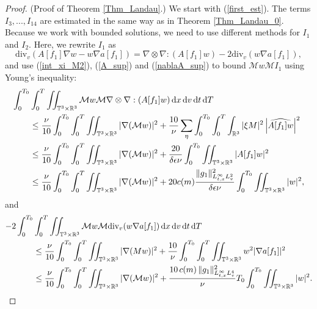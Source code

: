 \documentclass[11pt,american, reqno]{amsart}
\numberwithin{equation}{section}
\newcommand{\R}{\mathbb R}
\newcommand{\1}{\mathds{1}}
\newcommand{\dt}{\, {\rm d} t}
\newcommand{\dT}{\, {\rm d} T}
\newcommand{\dv}{\, {\rm d} v}
\newcommand{\dx}{\, {\rm d} x}
\newcommand{\CalM}{\mathcal{M}}
\newcommand{\dxi}{\, {\rm d} \xi}
\newcommand{\Eps}{\epsilon}
\newcommand{\abs}[1]{\left\vert#1\right\vert}
\newcommand{\T}{\mathbb{T}}
\numberwithin{equation}{section}
\begin{document}
\begin{proof}  (Proof of Theorem \ref{Thm_Landau}.)
We start with (\ref{first_est}). The terms $I_3, ... , I_{14}$ are estimated in the same way as in Theorem  \ref{Thm_Landau_0}. Because we work with bounded solutions, we need to use different methods for $I_1$ and $I_2$. 
Here, we rewrite $I_1$ as 
$$
\textrm{div}_v \left( A[f_1] \nabla w - w \nabla a[f_1]\right) 
= \nabla \otimes \nabla : ( A[f_1] w)  - 2 \textrm{div}_v (w \nabla a[f_1]) ,
$$
and use (\ref{int_xi_M2}), (\ref{A_sup}) and  (\ref{nablaA_sup}) to bound ${{\CalM} w} {\CalM} { I_1}$ using Young's inequality:
\begin{align*}
\int_0^{T_0} & \int_0^{T} \iint_{\T^3 \times \R^3} {{\CalM} w} {\CalM} {\nabla \otimes \nabla :( A[f_1] w)} \dx\dv\dt\dT 
\\
&\leq 
\frac{\nu}{10}\int_0^{T_0}\int_0^{T} \iint_{\T^3 \times \R^3} 
|\nabla(\CalM w)|^2 %
+ \frac{10}{\nu} \sum_{\eta}\int_0^{T_0}\int_0^{T} \int_{\R^3}  |\xi {M}|^2 \abs{\widehat{A[f_1] w}}^2 %
\\
&\leq   
\frac{\nu}{10}\int_0^{T_0}\int_0^{T} \iint_{\T^3 \times \R^3} 
|\nabla(\CalM w)|^2 %
+ \frac{20}{ \delta \Eps \nu} \int_0^{T_0}\iint_{\T^3 \times \R^3}  |A[f_1] w|^2 %
\\
&\leq   
\frac{\nu}{10}\int_0^{T_0}\int_0^{T} \iint_{\T^3 \times \R^3} 
|\nabla(\CalM w)|^2 %
+ 20 c(m)  \frac{\|g_1\|^2_{L_{t,x}^\infty L^2_v}}{\delta \epsilon \nu} 
\int_0^{T_0} \iint_{\T^3 \times \R^3}|w|^2, %
\end{align*} 
and
\begin{align*}
- 2 \int_0^{T_0} & \int_0^{T} \iint_{\T^3 \times \R^3} 
\CalM w \CalM \textrm{div}_v({w \nabla a[f_1]}) \dx\dv\dt\dT 
\\
& \le  
\frac{\nu}{10}\int_0^{T_0}\int_0^{T} \iint_{\T^3 \times \R^3} |\nabla({M} w)| ^2 %
+ \frac{10}{\nu} \int_0^{T_0}\int_0^{T} \iint_{\T^3 \times \R^3} 
w^2 |\nabla{a[f_1]}|^2 %
\\
&\le   
\frac{\nu}{10}\int_0^{T_0}\int_0^{T} \iint_{\T^3 \times \R^3} 
|\nabla(\CalM w)|^2 %
+ \frac{10 \, c(m) \, \|g_1\|^2_{L_{t,x}^\infty L^4_v}}{\nu} T_0 \int_0^{T_0}\iint_{\T^3 \times \R^3}  |w|^2 .%
\end{align*}

\end{proof}
\end{document}
